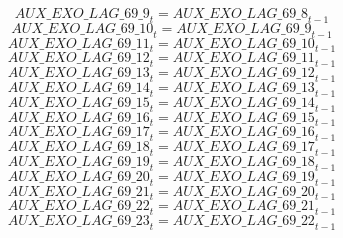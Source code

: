 \begin{dmath}
{AUX\_EXO\_LAG\_69\_9}_{t}={AUX\_EXO\_LAG\_69\_8}_{t-1}
\end{dmath}
\begin{dmath}
{AUX\_EXO\_LAG\_69\_10}_{t}={AUX\_EXO\_LAG\_69\_9}_{t-1}
\end{dmath}
\begin{dmath}
{AUX\_EXO\_LAG\_69\_11}_{t}={AUX\_EXO\_LAG\_69\_10}_{t-1}
\end{dmath}
\begin{dmath}
{AUX\_EXO\_LAG\_69\_12}_{t}={AUX\_EXO\_LAG\_69\_11}_{t-1}
\end{dmath}
\begin{dmath}
{AUX\_EXO\_LAG\_69\_13}_{t}={AUX\_EXO\_LAG\_69\_12}_{t-1}
\end{dmath}
\begin{dmath}
{AUX\_EXO\_LAG\_69\_14}_{t}={AUX\_EXO\_LAG\_69\_13}_{t-1}
\end{dmath}
\begin{dmath}
{AUX\_EXO\_LAG\_69\_15}_{t}={AUX\_EXO\_LAG\_69\_14}_{t-1}
\end{dmath}
\begin{dmath}
{AUX\_EXO\_LAG\_69\_16}_{t}={AUX\_EXO\_LAG\_69\_15}_{t-1}
\end{dmath}
\begin{dmath}
{AUX\_EXO\_LAG\_69\_17}_{t}={AUX\_EXO\_LAG\_69\_16}_{t-1}
\end{dmath}
\begin{dmath}
{AUX\_EXO\_LAG\_69\_18}_{t}={AUX\_EXO\_LAG\_69\_17}_{t-1}
\end{dmath}
\begin{dmath}
{AUX\_EXO\_LAG\_69\_19}_{t}={AUX\_EXO\_LAG\_69\_18}_{t-1}
\end{dmath}
\begin{dmath}
{AUX\_EXO\_LAG\_69\_20}_{t}={AUX\_EXO\_LAG\_69\_19}_{t-1}
\end{dmath}
\begin{dmath}
{AUX\_EXO\_LAG\_69\_21}_{t}={AUX\_EXO\_LAG\_69\_20}_{t-1}
\end{dmath}
\begin{dmath}
{AUX\_EXO\_LAG\_69\_22}_{t}={AUX\_EXO\_LAG\_69\_21}_{t-1}
\end{dmath}
\begin{dmath}
{AUX\_EXO\_LAG\_69\_23}_{t}={AUX\_EXO\_LAG\_69\_22}_{t-1}
\end{dmath}
